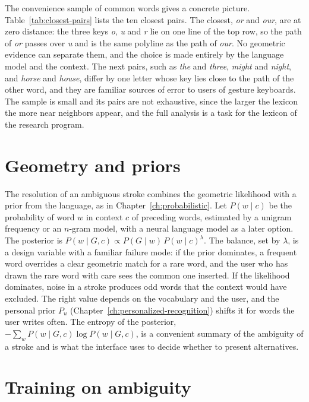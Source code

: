 The convenience sample of \lexN{} common words gives a concrete picture. Table~\ref{tab:closest-pairs} lists the ten closest pairs. The closest, \textit{or} and \textit{our}, are at zero distance: the three keys \textit{o}, \textit{u} and \textit{r} lie on one line of the top row, so the path of \textit{or} passes over \textit{u} and is the same polyline as the path of \textit{our}. No geometric evidence can separate them, and the choice is made entirely by the language model and the context. The next pairs, such as \textit{the} and \textit{three}, \textit{might} and \textit{night}, and \textit{horse} and \textit{house}, differ by one letter whose key lies close to the path of the other word, and they are familiar sources of error to users of gesture keyboards. The sample is small and its pairs are not exhaustive, since the larger the lexicon the more near neighbors appear, and the full analysis is a task for the lexicon of the research program.



\section{Geometry and priors}

The resolution of an ambiguous stroke combines the geometric likelihood with a prior from the language, as in Chapter~\ref{ch:probabilistic}. Let $P(w\mid c)$ be the probability of word $w$ in context $c$ of preceding words, estimated by a unigram frequency or an $n$-gram model, with a neural language model as a later option. The posterior is $P(w\mid G,c)\propto P(G\mid w)\,P(w\mid c)^{\lambda}$. The balance, set by $\lambda$, is a design variable with a familiar failure mode: if the prior dominates, a frequent word overrides a clear geometric match for a rare word, and the user who has drawn the rare word with care sees the common one inserted. If the likelihood dominates, noise in a stroke produces odd words that the context would have excluded. The right value depends on the vocabulary and the user, and the personal prior $P_u$ (Chapter~\ref{ch:personalized-recognition}) shifts it for words the user writes often. The entropy of the posterior, $-\sum_w P(w\mid G,c)\log P(w\mid G,c)$, is a convenient summary of the ambiguity of a stroke and is what the interface uses to decide whether to present alternatives.

\section{Training on ambiguity}

